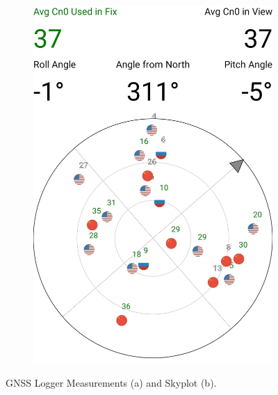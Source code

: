 \begin{figure}[htbp]
\begin{subfigure}{0.23\textwidth}
                \includegraphics[width=\textwidth]{images/screenshots/Screenshot_20250503_GnssLogger_skyplot.jpg}
                \label{fig:gnsslogger_skyplot}
            \end{subfigure}
            \caption{GNSS Logger Measurements (a) and Skyplot (b).}
            \label{fig:gnsslogger_3}
        \end{figure}
